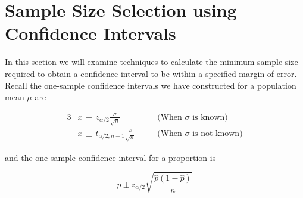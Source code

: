 \chapter{Sample Size Selection using Confidence Intervals}

In this section we will examine techniques to calculate the minimum sample size required to obtain a confidence interval to be within a specified margin of error.
Recall the one-sample confidence intervals we have constructed for a population mean $\mu$ are




\begin{alignat*}{3}
    & \bar{x} \, \pm \, z_{\alpha/2} \frac{\sigma}{\sqrt{n}}	&& \quad \text{(When } \sigma \text{ is known)}	\\[1.0em]
    & \bar{x} \, \pm \, t_{\alpha/2, n-1} \frac{s}{\sqrt{n}}		&& \quad	\text{(When } \sigma \text{ is not known)}
\end{alignat*}

and the one-sample confidence interval for a proportion is

\[
\hat p \pm z_{\alpha/2} \sqrt{\frac{\hat p(1-\hat p)}{n}}
\]

%


